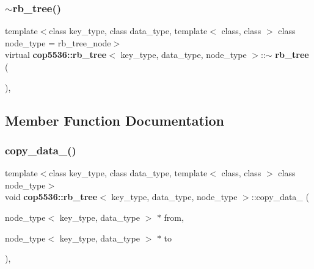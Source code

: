 \mbox{\label{classcop5536_1_1rb__tree_ad9ad1368b9fa7f6d2490855182ba4044}} 
\subsubsection{$\sim$rb\_tree()}
{\footnotesize\ttfamily template$<$class key\+\_\+type, class data\+\_\+type, template$<$ class, class $>$ class node\+\_\+type = rb\+\_\+tree\+\_\+node$>$ \\
virtual \textbf{ cop5536\+::rb\+\_\+tree}$<$ key\+\_\+type, data\+\_\+type, node\+\_\+type $>$\+::$\sim$\textbf{ rb\+\_\+tree} (\begin{DoxyParamCaption}{ }\end{DoxyParamCaption})\hspace{0.3cm}{\ttfamily [inline]}, {\ttfamily [virtual]}}



\subsection{Member Function Documentation}
\mbox{\label{classcop5536_1_1rb__tree_ae0a0258360bc0222fa84f380e799c813}} 
\subsubsection{copy\_data\_()}
{\footnotesize\ttfamily template$<$class key\+\_\+type, class data\+\_\+type, template$<$ class, class $>$ class node\+\_\+type$>$ \\
void \textbf{ cop5536\+::rb\+\_\+tree}$<$ key\+\_\+type, data\+\_\+type, node\+\_\+type $>$\+::copy\+\_\+data\+\_\+ (\begin{DoxyParamCaption}\item[{node\+\_\+type$<$ key\+\_\+type, data\+\_\+type $>$ $\ast$}]{from,  }\item[{node\+\_\+type$<$ key\+\_\+type, data\+\_\+type $>$ $\ast$}]{to }\end{DoxyParamCaption})\hspace{0.3cm}{\ttfamily [inline]}, {\ttfamily [virtual]}}

